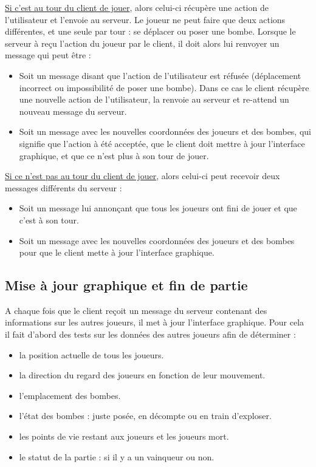 \underline{Si c'est au tour du client de jouer}, alors celui-ci récupère une action de l'utilisateur et l'envoie au serveur. Le joueur ne peut faire que deux actions différentes, et une seule par tour : se déplacer ou poser une bombe. Lorsque le serveur à reçu l'action du joueur par le client, il doit alors lui renvoyer un message qui peut être :
\begin{itemize}
	\item Soit un message disant que l'action de l'utilisateur est réfusée (déplacement incorrect ou impossibilité de poser une bombe). Dans ce cas le client récupère une nouvelle action de l'utilisateur, la renvoie au serveur et re-attend un nouveau message du serveur.
	\item Soit un message avec les nouvelles coordonnées des joueurs et des bombes, qui signifie que l'action à été acceptée, que le client doit mettre à jour l'interface graphique, et que ce n'est plus à son tour de jouer.
\end{itemize}

\vspace{0.5cm}

\underline{Si ce n'est pas au tour du client de jouer}, alors celui-ci peut recevoir deux messages différents du serveur :
\begin{itemize}
	\item Soit un message lui annonçant que tous les joueurs ont fini de jouer et que c'est à son tour.
	\item Soit un message avec les nouvelles coordonnées des joueurs et des bombes pour que le client mette à jour l'interface graphique.
\end{itemize}


\subsection*{Mise à jour graphique et fin de partie}

A chaque fois que le client reçoit un message du serveur contenant des informations sur les autres joueurs, il met à jour l'interface graphique. Pour cela il fait d'abord des tests sur les données des autres joueurs afin de déterminer :
\begin{itemize}
	\item la position actuelle de tous les joueurs.
	\item la direction du regard des joueurs en fonction de leur mouvement.
	\item l'emplacement des bombes.
	\item l'état des bombes : juste posée, en décompte ou en train d'exploser.
	\item les points de vie restant aux joueurs et les joueurs mort.
	\item le statut de la partie : si il y a un vainqueur ou non.
\end{itemize}

